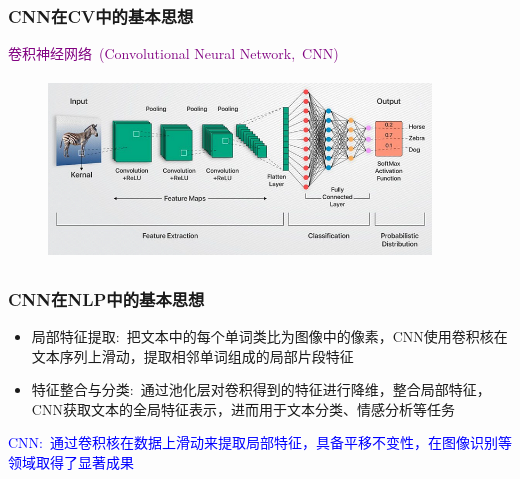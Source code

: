 \begin{frame}
	\frametitle{\textrm{CNN}在\textrm{CV}中的基本思想}
	\textcolor{purple}{卷积神经网络~\textrm{(Convolutional Neural Network,~CNN)}}
\begin{figure}[h!]
\vspace*{-0.05in}
\centering
\includegraphics[height=1.9in, width=4.0in, viewport=0 0 720 324,clip]{Figures/CNN-CV-model.png}
\label{CNN-CV-model}
\end{figure}
\end{frame}

\begin{frame}
	\frametitle{\textrm{CNN}在\textrm{NLP}中的基本思想}
    \begin{itemize}
		\setlength{\itemsep}{10pt}
		\item 局部特征提取:~把文本中的每个单词类比为图像中的像素，\textrm{CNN}使用卷积核在文本序列上滑动，提取相邻单词组成的局部片段特征\\
			{\fontsize{7.2pt}{6.2pt}\selectfont{多个不同大小的卷积核能够提取多种尺度的特征，捕捉单词间的局部语义关系}}
        \item 特征整合与分类:~通过池化层对卷积得到的特征进行降维，整合局部特征，\textrm{CNN}获取文本的全局特征表示，进而用于文本分类、情感分析等任务\\
		{\fontsize{7.2pt}{6.2pt}\selectfont{例如在情感分析中，通过卷积和池化操作提取文本特征，再经全连接层判断文本表达的情感倾向}}
    \end{itemize}
    \textcolor{blue}{\textrm{CNN}:~通过卷积核在数据上滑动来提取局部特征，具备平移不变性，在图像识别等领域取得了显著成果}\\
    \vskip 2pt
    {\fontsize{8.2pt}{6.2pt}}
\end{frame}

